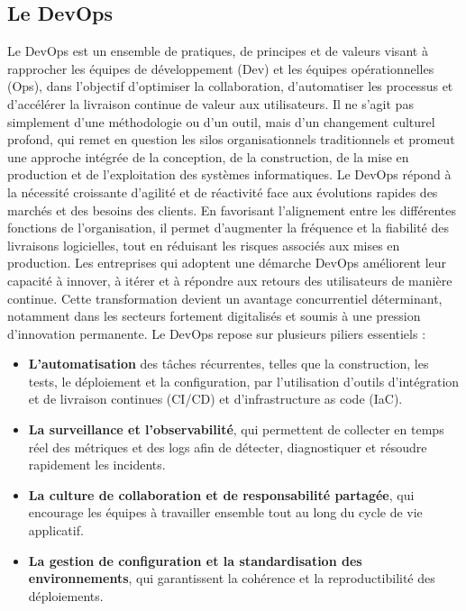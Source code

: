 \subsection{Le DevOps}

Le DevOps est un ensemble de pratiques, de principes et de valeurs visant à rapprocher les équipes de développement (Dev) et les équipes opérationnelles (Ops), dans l’objectif d’optimiser la collaboration, d’automatiser les processus et d’accélérer la livraison continue de valeur aux utilisateurs. Il ne s’agit pas simplement d’une méthodologie ou d’un outil, mais d’un changement culturel profond, qui remet en question les silos organisationnels traditionnels et promeut une approche intégrée de la conception, de la construction, de la mise en production et de l’exploitation des systèmes informatiques.
Le DevOps répond à la nécessité croissante d’agilité et de réactivité face aux évolutions rapides des marchés et des besoins des clients. En favorisant l’alignement entre les différentes fonctions de l’organisation, il permet d’augmenter la fréquence et la fiabilité des livraisons logicielles, tout en réduisant les risques associés aux mises en production. Les entreprises qui adoptent une démarche DevOps améliorent leur capacité à innover, à itérer et à répondre aux retours des utilisateurs de manière continue. Cette transformation devient un avantage concurrentiel déterminant, notamment dans les secteurs fortement digitalisés et soumis à une pression d’innovation permanente.
Le DevOps repose sur plusieurs piliers essentiels :
\begin{itemize}
	\item \textbf{L’automatisation} des tâches récurrentes, telles que la construction, les tests, le déploiement et la configuration, par l’utilisation d’outils d’intégration et de livraison continues (CI/CD) et d’infrastructure as code (IaC).
	\item \textbf{La surveillance et l’observabilité}, qui permettent de collecter en temps réel des métriques et des logs afin de détecter, diagnostiquer et résoudre rapidement les incidents.
	\item \textbf{La culture de collaboration et de responsabilité partagée}, qui encourage les équipes à travailler ensemble tout au long du cycle de vie applicatif.
	\item \textbf{La gestion de configuration et la standardisation des environnements}, qui garantissent la cohérence et la reproductibilité des déploiements.
\end{itemize}

